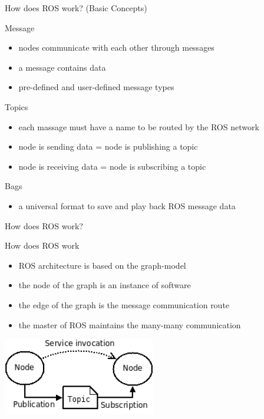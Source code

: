 \documentclass[10pt]{beamer}
\begin{document}
\begin{frame}[allowframebreaks]{How does ROS work? (Basic Concepts)}
\begin{block}{Message}
\begin{itemize}
   \item nodes communicate with each other through messages
   \item a message contains data
   \item pre-defined and user-defined message types
  \end{itemize}
 \end{block}
 \begin{block}{Topics}
  \begin{itemize}
   \item each massage must have a name to be routed by the ROS network
   \item node is sending data = node is publishing a topic
   \item node is receiving data = node is subscribing a topic
  \end{itemize}
 \end{block}
 \begin{block}{Bags}
  \begin{itemize}
   \item a universal format to save and play back ROS message data
  \end{itemize}
 \end{block}
 \end{frame}
 \begin{frame}{How does ROS work?}
 
 \begin{block}{How does ROS work}
 \begin{itemize}
   \item ROS architecture is based on the graph-model
   \item the node of the graph is an instance of software
   \item the edge of the graph is the message communication route
   \item the master of ROS maintains the many-many communication
 \end{itemize}
 \end{block} 
 \begin{center}
  \includegraphics[width=0.5\textwidth]{graph-model.png}
 \end{center}

 \end{frame}
\end{document}
